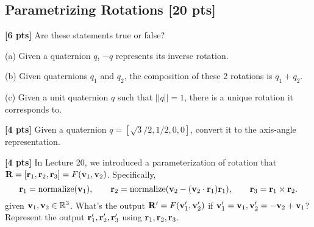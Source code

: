 \begin{questions}
    \section{Parametrizing Rotations [20 pts]}

    \question \textbf{[6 pts]} Are these statements true or false?

    (a) Given a quaternion $q$, $-q$ represents its inverse rotation.

    \begin{tcolorbox}[fit,height=6cm, width=\textwidth, blank, borderline={0.5pt}{-2pt},halign=left, valign=center, nobeforeafter]


    \end{tcolorbox}

    (b) Given quaternions $q_1$ and $q_2$, the composition of these 2 rotations is $q_1 + q_2$.

    \begin{tcolorbox}[fit,height=6cm, width=\textwidth, blank, borderline={0.5pt}{-2pt},halign=left, valign=center, nobeforeafter]


    \end{tcolorbox}

    (c) Given a unit quaternion $q$ such that $||q||=1$, there is a unique rotation it corresponds to.

    \begin{tcolorbox}[fit,height fill, width=\textwidth, blank, borderline={0.5pt}{-2pt},halign=left, valign=center, nobeforeafter]


    \end{tcolorbox}

    \clearpage

    \question \textbf{[4 pts]} Given a quaternion $q = [\sqrt{3}/2, 1/2, 0, 0]$, convert it to the axis-angle representation.

    \begin{tcolorbox}[fit,height fill, width=\textwidth, blank, borderline={0.5pt}{-2pt},halign=left, valign=center, nobeforeafter]


    \end{tcolorbox}

    \question \textbf{[4 pts]} In Lecture 20, we introduced a parameterization of rotation that $\mathbf{R} = [\mathbf{r}_1, \mathbf{r}_2, \mathbf{r}_3] = F(\mathbf{v}_1, \mathbf{v}_2)$. Specifically,
    \begin{equation*}
        \mathbf{r}_1 = \text{normalize}(\mathbf{v}_1), \qquad \mathbf{r}_2 = \text{normalize}(\mathbf{v}_2 - (\mathbf{v}_2 \cdot \mathbf{r}_1)\mathbf{r}_1), \qquad \mathbf{r}_3 = \mathbf{r}_1 \times \mathbf{r}_2.
    \end{equation*}
    given $\mathbf{v}_1, \mathbf{v}_2 \in \mathbb{R}^3$. What's the output $\mathbf{R}'= F(\mathbf{v}_1',\mathbf{v}_2')$ if $\mathbf{v}_1'=\mathbf{v}_1, \mathbf{v}_2' = -\mathbf{v}_2+\mathbf{v}_1$? Represent the output $\mathbf{r}_1', \mathbf{r}_2', \mathbf{r}_3'$ using $\mathbf{r}_1, \mathbf{r}_2, \mathbf{r}_3$.


\end{questions}
